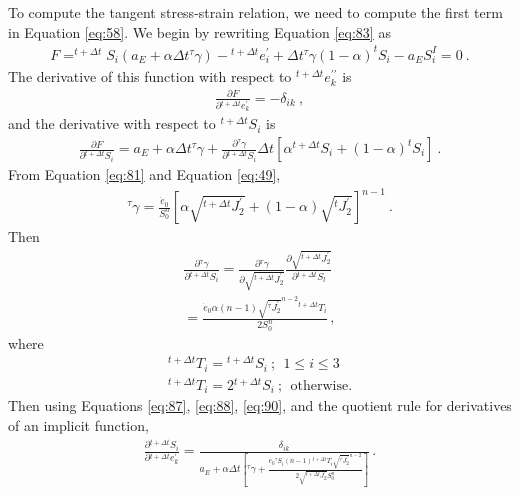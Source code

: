 To compute the tangent stress-strain relation, we need to compute
the first term in Equation \ref{eq:58}. We begin by rewriting Equation
\ref{eq:83} as
\begin{gather}
F=^{t+\Delta t}S_{i}\left(a_{E}+\alpha\Delta t\phantom{}^{\tau}\gamma\right)-\phantom{}^{t+\Delta t}e_{i}^{\prime}+\Delta t\phantom{}^{\tau}\gamma\left(1-\alpha\right)^{t}S_{i}-a_{E}S_{i}^{I}=0\:.\label{eq:86}
\end{gather}
The derivative of this function with respect to $^{t+\Delta t}e_{k}^{\prime\prime}$
is
\begin{gather}
\frac{\partial F}{\partial\phantom{}^{t+\Delta t}e_{k}^{\prime}}=-\delta_{ik}\:,\label{eq:87}
\end{gather}
and the derivative with respect to $^{t+\Delta t}S_{i}$ is
\begin{gather}
\frac{\partial F}{\partial\phantom{}^{t+\Delta t}S_{i}}=a_{E}+\alpha\Delta t\phantom{}^{\tau}\gamma+\frac{\partial\phantom{}^{\tau}\gamma}{\partial\phantom{}^{t+\Delta t}S_{i}}\Delta t\left[\alpha\phantom{}^{t+\Delta t}S_{i}+\left(1-\alpha\right)^{t}S_{i}\right]\:.\label{eq:88}
\end{gather}
From Equation \ref{eq:81} and Equation \ref{eq:49},
\begin{gather}
^{\tau}\gamma=\frac{\dot{e}_{0}}{S_{0}^{n}}\left[\alpha\sqrt{^{t+\Delta t}J_{2}^{\prime}}+\left(1-\alpha\right)\sqrt{^{t}J_{2}^{\prime}}\right]^{n-1}\:.\label{eq:89}
\end{gather}
Then
\begin{gather}
\frac{\partial\phantom{}^{\tau}\gamma}{\partial{}^{t+\Delta t}S_{i}}=\frac{\partial\phantom{}^{\tau}\gamma}{\partial\sqrt{^{t+\Delta t}J_{2}^{\prime}}}\frac{\partial\sqrt{^{t+\Delta t}J_{2}^{\prime}}}{\partial\phantom{}^{t+\Delta t}S_{l}}\label{eq:90}\\
=\frac{\dot{e}_{0}\alpha\left(n-1\right)\sqrt{^{\tau}J_{2}^{\prime}}^{n-2}{}^{t+\Delta t}T_{i}}{2S_{0}^{n}}\,,\nonumber 
\end{gather}
where
\begin{gather}
^{t+\Delta t}T_{i}=\phantom{}^{t+\Delta t}S_{i}\:;\:\:1\leq i\leq3\label{eq:91}\\
^{t+\Delta t}T_{i}=2\phantom{}^{t+\Delta t}S_{i}\:;\:\:\textrm{otherwise.}\nonumber 
\end{gather}
Then using Equations \ref{eq:87}, \ref{eq:88}, \ref{eq:90}, and
the quotient rule for derivatives of an implicit function,
\begin{gather}
\frac{\partial\phantom{}^{t+\Delta t}S_{i}}{\partial{}^{t+\Delta t}e_{k}^{\prime}}=\frac{\delta_{ik}}{a_{E}+\alpha\Delta t\left[^{\tau}\gamma+\frac{\dot{e}_{0}{}^{\tau}S_{i}\left(n-1\right){}^{t+\Delta t}T_{i}\sqrt{^{\tau}J_{2}^{\prime}}^{n-2}}{2\sqrt{^{t+\Delta t}J_{2}^{\prime}}S_{0}^{n}}\right]}\,.\label{eq:92}
\end{gather}
